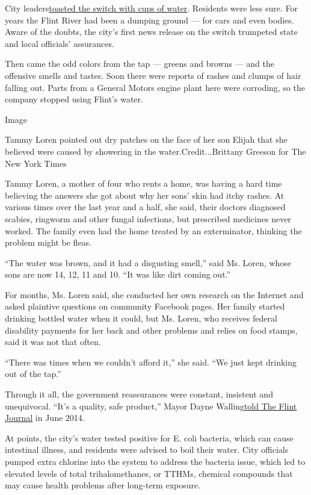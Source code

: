 City
leaders\href{http://www.nytimes.com/2014/05/26/business/detroit-plan-to-profit-on-water-looks-half-empty.html?_r=0}{toasted
the switch with cups of water}. Residents were less sure. For years the
Flint River had been a dumping ground --- for cars and even bodies.
Aware of the doubts, the city's first news release on the switch
trumpeted state and local officials' assurances.

Then came the odd colors from the tap --- greens and browns --- and the
offensive smells and tastes. Soon there were reports of rashes and
clumps of hair falling out. Parts from a General Motors engine plant
here were corroding, so the company stopped using Flint's water.

Image

Tammy Loren pointed out dry patches on the face of her son Elijah that
she believed were caused by showering in the water.Credit...Brittany
Greeson for The New York Times

Tammy Loren, a mother of four who rents a home, was having a hard time
believing the answers she got about why her sons' skin had itchy rashes.
At various times over the last year and a half, she said, their doctors
diagnosed scabies, ringworm and other fungal infections, but prescribed
medicines never worked. The family even had the home treated by an
exterminator, thinking the problem might be fleas.

``The water was brown, and it had a disgusting smell,'' said Ms. Loren,
whose sons are now 14, 12, 11 and 10. ``It was like dirt coming out.''

For months, Ms. Loren said, she conducted her own research on the
Internet and asked plaintive questions on community Facebook pages. Her
family started drinking bottled water when it could, but Ms. Loren, who
receives federal disability payments for her back and other problems and
relies on food stamps, said it was not that often.

``There was times when we couldn't afford it,'' she said. ``We just kept
drinking out of the tap.''

Through it all, the government reassurances were constant, insistent and
unequivocal. ``It's a quality, safe product,'' Mayor Dayne
Walling\href{http://www.mlive.com/news/flint/index.ssf/2014/06/treated_flint_river_water_meet.html}{told
The Flint Journal} in June 2014.

At points, the city's water tested positive for E. coli bacteria, which
can cause intestinal illness, and residents were advised to boil their
water. City officials pumped extra chlorine into the system to address
the bacteria issue, which led to elevated levels of total
trihalomethanes, or TTHMs, chemical compounds that may cause health
problems after long-term exposure.

